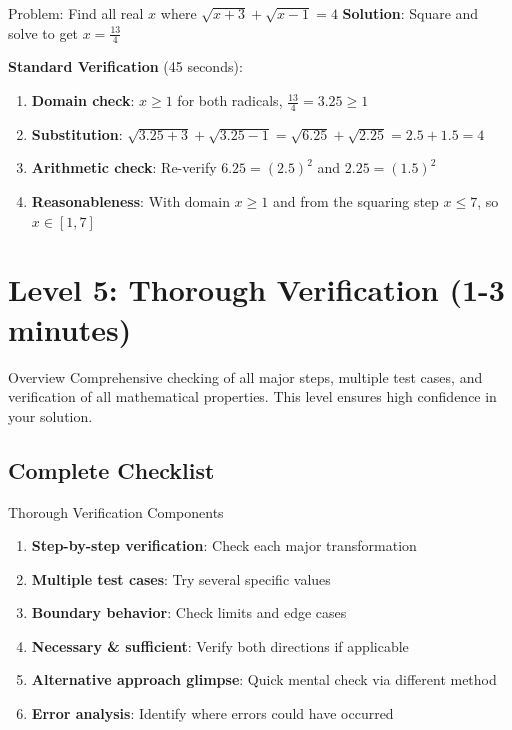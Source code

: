 \documentclass{article}
\begin{document}
\begin{standardbox}{Problem: Find all real $x$ where $\sqrt{x+3} + \sqrt{x-1} = 4$}
\textbf{Solution}: Square and solve to get $x = \frac{13}{4}$

\textbf{Standard Verification} (45 seconds):
\begin{enumerate}[nosep]
\item \textbf{Domain check}: $x \geq 1$ for both radicals, $\frac{13}{4} = 3.25 \geq 1$ \checkmark
\item \textbf{Substitution}: $\sqrt{3.25+3} + \sqrt{3.25-1} = \sqrt{6.25} + \sqrt{2.25} = 2.5 + 1.5 = 4$ \checkmark
\item \textbf{Arithmetic check}: Re-verify $6.25 = (2.5)^2$ and $2.25 = (1.5)^2$ \checkmark
\item \textbf{Reasonableness}: With domain $x \geq 1$ and from the squaring step $x \leq 7$, so $x \in [1,7]$ \checkmark
\end{enumerate}
\end{standardbox}

\newpage

\section{Level 5: Thorough Verification (1-3 minutes)}

\begin{thoroughbox}{Overview}
Comprehensive checking of all major steps, multiple test cases, and verification of all mathematical properties. This level ensures high confidence in your solution.
\end{thoroughbox}

\subsection{Complete Checklist}

\begin{thoroughbox}{Thorough Verification Components}
\begin{enumerate}
\item \textbf{Step-by-step verification}: Check each major transformation
\item \textbf{Multiple test cases}: Try several specific values
\item \textbf{Boundary behavior}: Check limits and edge cases
\item \textbf{Necessary \& sufficient}: Verify both directions if applicable
\item \textbf{Alternative approach glimpse}: Quick mental check via different method
\item \textbf{Error analysis}: Identify where errors could have occurred
\end{enumerate}
\end{thoroughbox}
\end{document}

